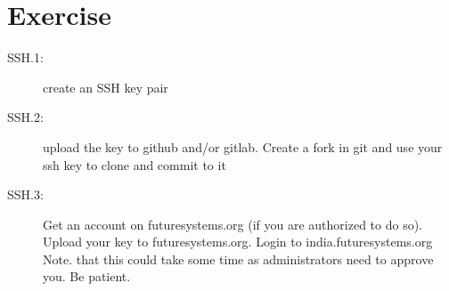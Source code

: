 
\section{Exercise}\label{exercise}

\begin{description}
\item[SSH.1:]
create an SSH key pair
\item[SSH.2:]
upload the key to github and/or gitlab. Create a fork in git and use
your ssh key to clone and commit to it
\item[SSH.3:]
Get an account on futuresystems.org (if you are authorized to do so).
Upload your key to futuresystems.org. Login to india.futuresystems.org
Note. that this could take some time as administrators need to approve
you. Be patient.
\end{description}
